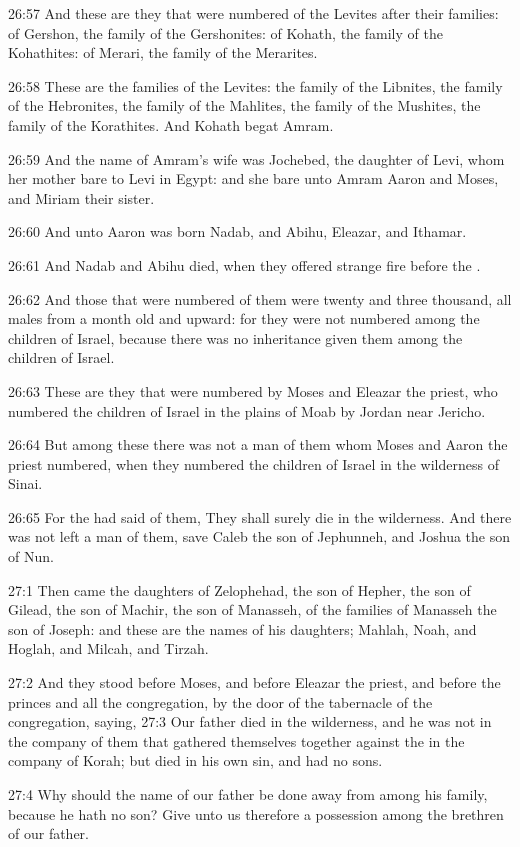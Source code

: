 26:57 And these are they that were numbered of the Levites after their families: of Gershon, the family of the Gershonites: of Kohath, the family of the Kohathites: of Merari, the family of the Merarites.

26:58 These are the families of the Levites: the family of the Libnites, the family of the Hebronites, the family of the Mahlites, the family of the Mushites, the family of the Korathites. And Kohath begat Amram.

26:59 And the name of Amram's wife was Jochebed, the daughter of Levi, whom her mother bare to Levi in Egypt: and she bare unto Amram Aaron and Moses, and Miriam their sister.

26:60 And unto Aaron was born Nadab, and Abihu, Eleazar, and Ithamar.

26:61 And Nadab and Abihu died, when they offered strange fire before the \LORD.

26:62 And those that were numbered of them were twenty and three thousand, all males from a month old and upward: for they were not numbered among the children of Israel, because there was no inheritance given them among the children of Israel.

26:63 These are they that were numbered by Moses and Eleazar the priest, who numbered the children of Israel in the plains of Moab by Jordan near Jericho.

26:64 But among these there was not a man of them whom Moses and Aaron the priest numbered, when they numbered the children of Israel in the wilderness of Sinai.

26:65 For the \LORD had said of them, They shall surely die in the wilderness. And there was not left a man of them, save Caleb the son of Jephunneh, and Joshua the son of Nun.

27:1 Then came the daughters of Zelophehad, the son of Hepher, the son of Gilead, the son of Machir, the son of Manasseh, of the families of Manasseh the son of Joseph: and these are the names of his daughters; Mahlah, Noah, and Hoglah, and Milcah, and Tirzah.

27:2 And they stood before Moses, and before Eleazar the priest, and before the princes and all the congregation, by the door of the tabernacle of the congregation, saying, 27:3 Our father died in the wilderness, and he was not in the company of them that gathered themselves together against the \LORD in the company of Korah; but died in his own sin, and had no sons.

27:4 Why should the name of our father be done away from among his family, because he hath no son? Give unto us therefore a possession among the brethren of our father.


